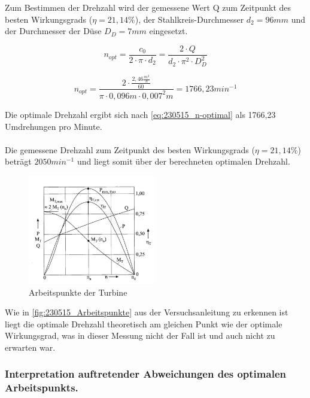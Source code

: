 Zum Bestimmen der Drehzahl wird der gemessene Wert Q zum Zeitpunkt des besten Wirkungsgrads ($\eta=21,14\%$), der Stahlkreis-Durchmesser $d_{2} = 96mm$ und der Durchmesser der Düse $D_{D} = 7mm$ eingesetzt. 

\begin{equation}
 n_{opt}=\frac{c_{0}}{2 \cdot \pi \cdot d_{2}}=\frac{2 \cdot Q}{d_{2} \cdot \pi^2  \cdot D_{D}^2}
\label{eq:230515_n-optimal}
\end{equation}

\begin{equation}
n_{opt}=\frac{ 2 \cdot \frac{2,46 \frac{m^3}{h}}{60}}{\pi \cdot 0,096 m \cdot 0,007^2m}=1766,23  min^{-1}
\label{eq:230515_n-optimal2}
\end{equation}


 Die optimale Drehzahl ergibt sich nach \autoref{eq:230515_n-optimal} als 1766,23 Umdrehungen pro Minute.
\\\\
Die gemessene Drehzahl zum Zeitpunkt des besten Wirkungsgrads ($\eta=21,14\%$) beträgt $2050 min^{-1}$ und liegt somit über der berechneten optimalen Drehzahl. 

\begin{figure}[!ht]
		\centering
		\includegraphics[width=0.5\textwidth]{Abbildungen/Arbeitspunkte}
		\caption{Arbeitspunkte der Turbine}
		\label{fig:230515_Arbeitspunkte}
\end{figure}

Wie in \autoref{fig:230515_Arbeitspunkte} aus der Versuchsanleitung zu erkennen ist liegt die optimale Drehzahl theoretisch am gleichen Punkt wie der optimale Wirkungsgrad, was in dieser Messung nicht der Fall ist und auch nicht zu erwarten war.


\subsubsection{Interpretation auftretender Abweichungen des optimalen Arbeitspunkts.}

